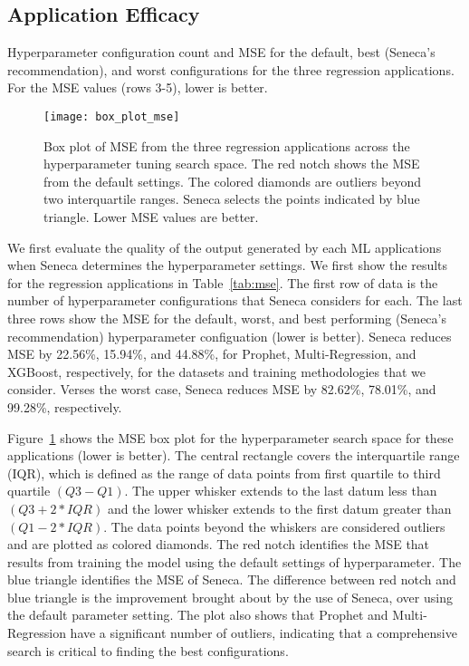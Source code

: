 \subsection{Application Efficacy}

\begin{table}
\centering

\caption{Hyperparameter configuration count and MSE for the default, 
best (Seneca's recommendation), and worst configurations for the three regression applications. 
For the MSE  values (rows 3-5), lower is better.
\label{tab:mse}}
\vspace{-0.2in}
\end{table}

\begin{figure}[t] \centering 
\vspace{-0.5in}
\texttt{[image: box\_plot\_mse]}
\caption{Box plot of MSE from the three regression applications across the 
hyperparameter tuning search space. The red notch shows the MSE from the default settings. 
The colored diamonds are outliers beyond two interquartile ranges. 
Seneca selects the points indicated by blue triangle.
Lower MSE values are better. 
\label{fig:box_plot_mse}}
\vspace{-0.2in}
\end{figure}

We first evaluate the quality of the output generated by each
ML applications when Seneca determines the hyperparameter settings. We
first show the results for the regression applications in
Table~\ref{tab:mse}.
The first row of data is the number of hyperparameter 
configurations that Seneca considers for each.
The last three rows show the MSE for the default, worst, and best performing (Seneca's recommendation)
hyperparameter configuation (lower is better).
Seneca reduces MSE by 22.56\%, 15.94\%, and 44.88\%, for Prophet, Multi-Regression, and XGBoost,
respectively, for the datasets and training methodologies that we consider.
Verses the worst case, Seneca reduces MSE by 82.62\%, 78.01\%, and 99.28\%, respectively.

Figure~\ref{fig:box_plot_mse} shows the MSE box plot for the hyperparameter search space for these applications (lower is better). 
The central rectangle covers the interquartile range (IQR),
which is defined as the range of data
points from first quartile to third quartile \texttt{$(Q3 - Q1)$}.
The upper whisker extends to the last datum less
than \texttt{$(Q3 + 2 * IQR)$} and the lower whisker extends to the first datum greater
than \texttt{$(Q1 - 2 * IQR)$}. The data points beyond the whiskers are considered outliers
and are plotted as colored diamonds. The red notch identifies the MSE that results from training
the model using the default settings of hyperparameter.
The blue triangle identifies the MSE of Seneca.
The difference between red notch and blue triangle
is the improvement brought about by the use of Seneca, over 
using the default parameter setting.
The plot also shows
that Prophet and Multi-Regression have a significant number of outliers,
indicating that a comprehensive search is critical to finding the best configurations.

